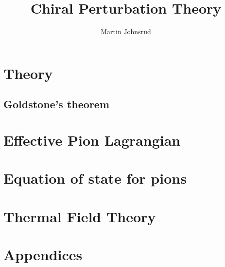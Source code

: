 \documentclass{book}
\title{Chiral Perturbation Theory}
\author{Martin Johnsrud}
\begin{document}
\maketitle 

\tableofcontents

\chapter{Theory}



\section{Goldstone's theorem}



\chapter{Effective Pion Lagrangian}
\label{serction:effective_pion_lagrangian}








\chapter{Equation of state for pions}



\chapter{Thermal Field Theory}
\label{section:thermal field theory}







\appendix
\chapter{Appendices}





\end{document}
